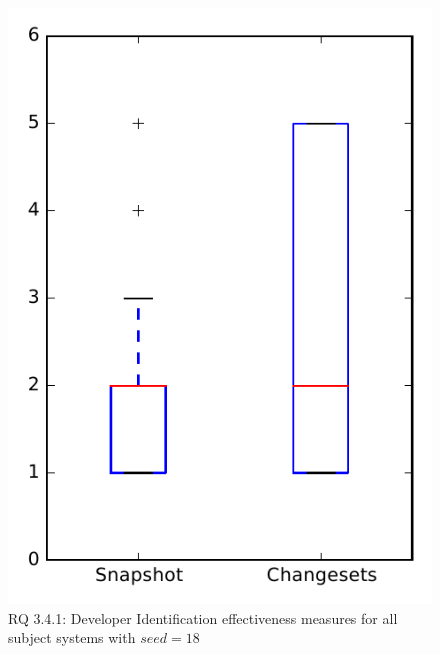 
\begin{figure}
\centering
\includegraphics[height=0.4\textheight]{figures/dit_seed/rq1_overview_18}
\caption{RQ 3.4.1: Developer Identification effectiveness measures for all subject systems with $seed=18$}
\label{fig:dit_seed:rq1:overview}
\end{figure}
